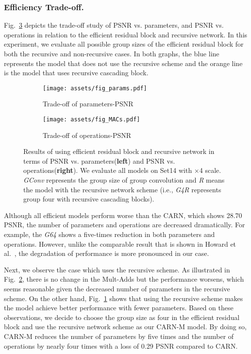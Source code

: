 \documentclass[runningheads]{llncs}
\begin{document}
\subsubsection{Efficiency Trade-off.}
Fig.~\ref{fig:efficient} depicts the trade-off study of PSNR vs. parameters, and PSNR vs. operations in relation to the efficient residual block and recursive network. In this experiment, we evaluate all possible group sizes of the efficient residual block for both the recursive and non-recursive cases. In both graphs, the blue line represents the model that does not use the recursive scheme and the orange line is the model that uses recursive cascading block.

\begin{figure}[tbp]
	\centering
	\begin{subfigure}[b]{0.48\textwidth}
		\texttt{[image: assets/fig\_params.pdf]}
		\caption{Trade-off of parameters-PSNR}
		\label{fig:params}
	\end{subfigure}
	\begin{subfigure}[b]{0.48\textwidth}
		\texttt{[image: assets/fig\_MACs.pdf]}
		\caption{Trade-off of operations-PSNR}
		\label{fig:macs}
	\end{subfigure}
	\caption{Results of using efficient residual block and recursive network in terms of PSNR vs. parameters(\textbf{left}) and PSNR vs. operations(\textbf{right}). We evaluate all models on Set14 with $\times$4 scale. \textit{GConv} represents the group size of group convolution and \textit{R} means the model with the recursive network scheme (i.e., \textit{G4R} represents group four with recursive cascading blocks).}
	\label{fig:efficient}
\end{figure}

Although all efficient models perform worse than the CARN, which shows 28.70 PSNR, the number of parameters and operations are decreased dramatically. For example, the \textit{G64} shows a five-times reduction in both parameters and operations. However, unlike the comparable result that is shown in Howard et al.~\cite{mobilenets}, the degradation of performance is more pronounced in our case.

Next, we observe the case which uses the recursive scheme. As illustrated in Fig.~\ref{fig:macs}, there is no change in the Mult-Adds but the performance worsens, which seems reasonable given the decreased number of parameters in the recursive scheme. On the other hand, Fig.~\ref{fig:params} shows that using the recursive scheme makes the model achieve better performance with fewer parameters. Based on these observations, we decide to choose the group size as four in the efficient residual block and use the recursive network scheme as our CARN-M model. By doing so, CARN-M reduces the number of parameters by five times and the number of operations by nearly four times with a loss of 0.29 PSNR compared to CARN.
\end{document}
